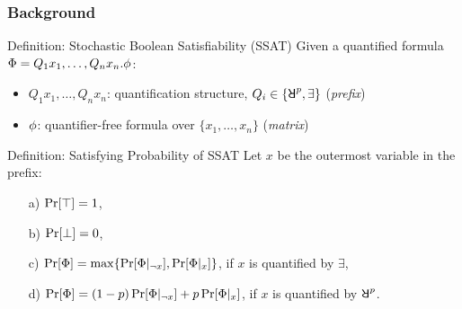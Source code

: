 \begin{frame}
      \frametitle{Background}
      \begin{block}{Definition: Stochastic Boolean Satisfiability (SSAT)}
            Given a quantified formula $\Phi=Q_1 x_1,\ldots,Q_n x_n.\phi$:
            \pause
            \begin{itemize}
                  \item $Q_1 x_1,\ldots,Q_n x_n$: quantification structure, $Q_i \in \{\random{p},\exists\}$ (\emph{prefix})
                        \pause
                  \item $\phi$: quantifier-free formula over $\{x_1,\ldots,x_n\}$ (\emph{matrix})
            \end{itemize}
      \end{block}
      \pause
      \begin{block}{Definition: Satisfying Probability of SSAT}
            Let $x$ be the outermost variable in the prefix:
            \pause
            \begin{enumerate}
                  \item[a)] $\Pr[\top]=1$,
                        \pause
                  \item[b)] $\Pr[\bot]=0$,
                        \pause
                  \item[c)] $\Pr[\Phi]=\max\{\Pr[\Phi|_{\lnot x}],\Pr[\Phi|_{x}]\}$, if $x$ is quantified by $\exists$,
                        \pause
                  \item[d)] $\Pr[\Phi]=(1-p)\Pr[\Phi|_{\lnot x}]+p\Pr[\Phi|_{x}]$, if $x$ is quantified by $\random{p}$.
            \end{enumerate}
      \end{block}
\end{frame}

